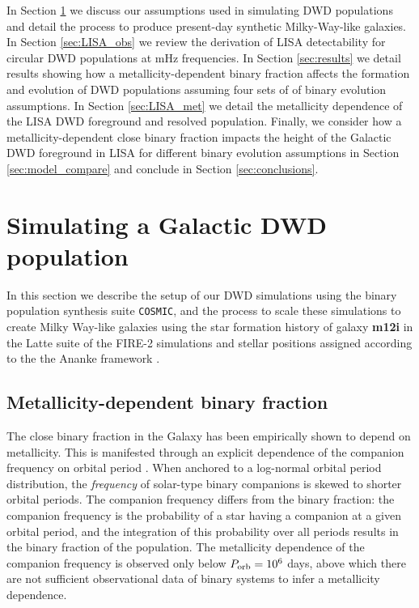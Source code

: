 \documentclass[twocolumn, linenumbers]{aastex631}
\newcommand{\cosmic}{\texttt{COSMIC}}
\begin{document}
In Section \ref{sec:simulations} we discuss our assumptions used in 
simulating DWD populations and detail the process to produce present-day 
synthetic Milky-Way-like galaxies. In Section \ref{sec:LISA_obs} we review 
the derivation of LISA detectability for circular DWD populations at mHz 
frequencies. In Section \ref{sec:results} we detail results showing how a 
metallicity-dependent binary fraction affects the formation and evolution 
of DWD populations assuming four sets of of binary evolution assumptions. 
In Section \ref{sec:LISA_met} we detail the metallicity dependence of the 
LISA DWD foreground and resolved population. Finally, we consider how a 
metallicity-dependent close binary fraction impacts the height of the 
Galactic DWD foreground in LISA for different binary evolution assumptions 
in Section \ref{sec:model_compare} and conclude in Section 
\ref{sec:conclusions}.  

\section{Simulating a Galactic DWD population}\label{sec:simulations}
In this section we describe the setup of our DWD simulations using the 
binary population synthesis suite \cosmic, and the process to scale these 
simulations to create Milky Way-like galaxies using the star formation 
history of galaxy \textbf{m12i} in the Latte suite of the FIRE-2 
simulations \citep{Wetzel2016, Hopkins2018} and stellar positions assigned 
according to the the Ananke framework \citep{Sanderson2020}. 

\subsection{Metallicity-dependent binary 
fraction}\label{subsec:metbinfrac}
The close binary fraction in the Galaxy has been empirically shown to 
depend on metallicity. This is manifested through an explicit dependence 
of the companion frequency on orbital period \citep{Moe2021}. When 
anchored to a log-normal orbital period distribution, the \emph{frequency} 
of solar-type binary companions is skewed to shorter orbital periods. The 
companion frequency differs from the binary fraction: the companion 
frequency is the probability of a star having a companion at a given 
orbital period, and the integration of this probability over all periods 
results in the binary fraction of the population. The metallicity 
dependence of the companion frequency is observed only below 
$P_{\rm{orb}}=10^6$ days, above which there are not sufficient 
observational data of binary systems to infer a metallicity dependence.
\end{document}
